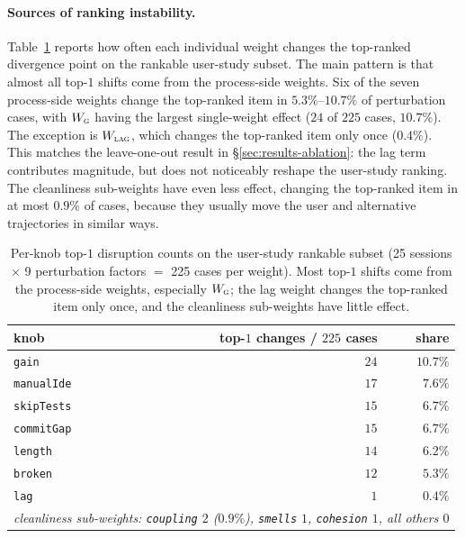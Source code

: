 \paragraph{Sources of ranking instability.}
Table~\ref{tab:results-sensitivity-knobs} reports how often each individual weight changes the top-ranked divergence point on the rankable user-study subset. The main pattern is that almost all top-$1$ shifts come from the process-side weights. Six of the seven process-side weights change the top-ranked item in $5.3\%$--$10.7\%$ of perturbation cases, with $W_{\textsc{g}}$ having the largest single-weight effect ($24$ of $225$ cases, $10.7\%$). The exception is $W_{\textsc{lag}}$, which changes the top-ranked item only once ($0.4\%$). This matches the leave-one-out result in \S\ref{sec:results-ablation}: the lag term contributes magnitude, but does not noticeably reshape the user-study ranking. The cleanliness sub-weights have even less effect, changing the top-ranked item in at most $0.9\%$ of cases, because they usually move the user and alternative trajectories in similar ways.

\begin{table}[htbp]
\centering
\small
\begin{tabular}{lrr}
\hline
\textbf{knob} & \textbf{top-$1$ changes / $225$ cases} & \textbf{share} \\
\hline
\texttt{gain}        & $24$ & $10.7\%$ \\
\texttt{manualIde}   & $17$ & $7.6\%$ \\
\texttt{skipTests}   & $15$ & $6.7\%$ \\
\texttt{commitGap}   & $15$ & $6.7\%$ \\
\texttt{length}      & $14$ & $6.2\%$ \\
\texttt{broken}      & $12$ & $5.3\%$ \\
\texttt{lag}         &  $1$ & $0.4\%$ \\
\hline
\multicolumn{3}{l}{\textit{cleanliness sub-weights: \texttt{coupling} $2$ ($0.9\%$), \texttt{smells} $1$, \texttt{cohesion} $1$, all others $0$}} \\
\hline
\end{tabular}
\caption{Per-knob top-$1$ disruption counts on the user-study rankable subset (25 sessions $\times$ 9 perturbation factors $=$ 225 cases per weight). Most top-$1$ shifts come from the process-side weights, especially $W_{\textsc{g}}$; the lag weight changes the top-ranked item only once, and the cleanliness sub-weights have little effect.}
\label{tab:results-sensitivity-knobs}
\end{table}

